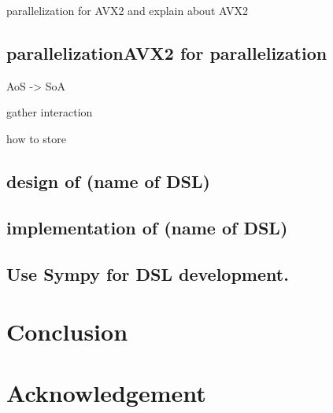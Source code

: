 \documentclass[ams]{U-AizuGT}
\begin{document}
parallelization for AVX2 and explain about AVX2


\subsection{parallelizationAVX2 for parallelization}
AoS -> SoA


gather interaction


how to store


\subsection{design of (name of DSL)}

\subsection{implementation of (name of DSL)}



\subsection{Use Sympy for DSL development.}

\section{Conclusion}
\section{Acknowledgement}

\end{document}
